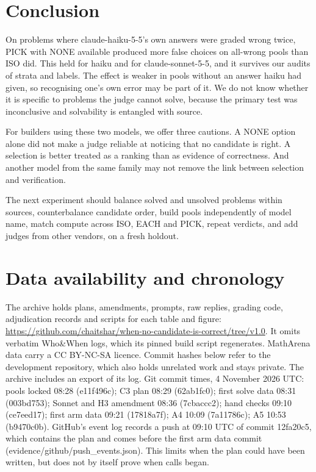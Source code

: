 \documentclass[10pt,twocolumn]{article}
\begin{document}
\section{Conclusion}
On problems where claude-haiku-5-5's own answers were graded wrong twice, PICK with NONE available produced more false choices on all-wrong pools than ISO did. This held for haiku and for claude-sonnet-5-5, and it survives our audits of strata and labels. The effect is weaker in pools without an answer haiku had given, so recognising one's own error may be part of it. We do not know whether it is specific to problems the judge cannot solve, because the primary test was inconclusive and solvability is entangled with source.

For builders using these two models, we offer three cautions. A NONE option alone did not make a judge reliable at noticing that no candidate is right. A selection is better treated as a ranking than as evidence of correctness. And another model from the same family may not remove the link between selection and verification.

The next experiment should balance solved and unsolved problems within sources, counterbalance candidate order, build pools independently of model name, match compute across ISO, EACH and PICK, repeat verdicts, and add judges from other vendors, on a fresh holdout.

\section*{Data availability and chronology}
The archive holds plans, amendments, prompts, raw replies, grading code, adjudication records and scripts for each table and figure: \url{https://github.com/chaitshar/when-no-candidate-is-correct/tree/v1.0}. It omits verbatim Who\&When logs, which its pinned build script regenerates. MathArena data carry a CC BY-NC-SA licence. Commit hashes below refer to the development repository, which also holds unrelated work and stays private. The archive includes an export of its log. Git commit times, 4 November 2026 UTC: pools locked 08:28 (e11f496c); C3 plan 08:29 (62ab1fc0); first solve data 08:31 (003bd753); Sonnet and H3 amendment 08:36 (7cbaccc2); hand checks 09:10 (ce7eed17); first arm data 09:21 (17818a7f); A4 10:09 (7a11786c); A5 10:53 (b9470c0b). GitHub's event log records a push at 09:10 UTC of commit 12fa20c5, which contains the plan and comes before the first arm data commit (evidence/github/push\_events.json). This limits when the plan could have been written, but does not by itself prove when calls began.
\end{document}
